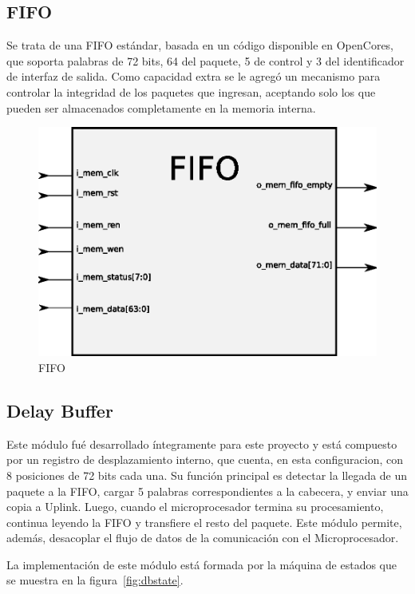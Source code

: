 \subsection{FIFO}
Se trata de una FIFO estándar, basada en un código disponible en OpenCores, que soporta palabras de 72 bits, 64 del paquete, 5 de control y 3 del identificador de interfaz de salida. Como capacidad extra se le agregó un mecanismo para controlar la integridad de los paquetes que ingresan, aceptando solo los que pueden ser almacenados completamente en la memoria interna. 

\begin{figure}[H]
  \centering
	\includegraphics[scale=0.50]{3-arquitectura/graf/bloqfifo.eps}
  \caption{FIFO}
  \label{fig:gen}
\end{figure}

\subsection{Delay Buffer}
Este módulo fué desarrollado íntegramente para este proyecto y está compuesto por un registro de desplazamiento interno, que cuenta, en esta configuracion, con 8 posiciones de 72 bits cada una. Su función principal es detectar la llegada de un paquete a la FIFO, cargar 5 palabras correspondientes a la cabecera, y enviar una copia a Uplink. Luego, cuando el microprocesador termina su procesamiento, continua leyendo la FIFO y transfiere el resto del paquete. Este módulo permite, además, desacoplar el flujo de datos de la comunicación con el Microprocesador.

La implementación de este módulo está formada por la máquina de estados que se muestra en la figura~\ref{fig:dbstate}.

